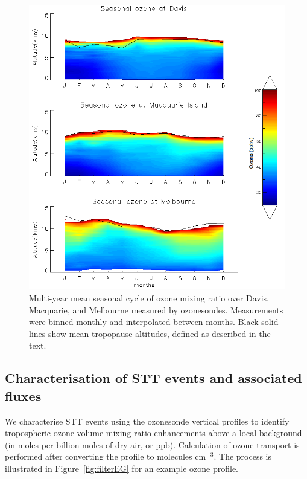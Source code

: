 \documentclass{article}
\begin{document}
    \begin{figure}[!htbp]
      \begin{center}
      \includegraphics[width=0.8\columnwidth]{figures/seasonaltropozone}
      \caption{
      Multi-year mean seasonal cycle of ozone mixing ratio over Davis, Macquarie, and Melbourne measured by ozonesondes.
      Measurements were binned monthly and interpolated between months.
      Black solid lines show mean tropopause altitudes, defined as described in the text.
      }
      \label{fig:seasonaltropozone}
      \end{center}
    \end{figure}

  \subsection{Characterisation of STT events and associated fluxes}
    \label{Section:CharacterisationOfSTTs}
    
    We characterise STT events using the ozonesonde vertical profiles to identify tropospheric ozone volume mixing ratio enhancements above a local background (in moles per billion moles of dry air, or ppb).
    Calculation of ozone transport is performed after converting the profile to molecules cm$^{-3}$.
    The process is illustrated in Figure~\ref{fig:filterEG} for an example ozone profile.
    
\end{document}
